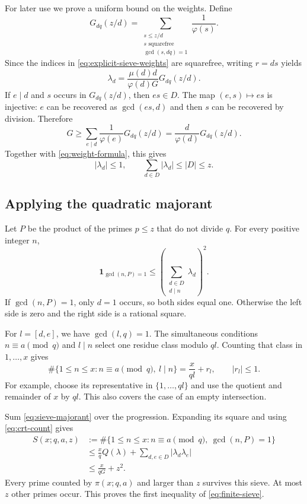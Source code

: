 For later use we prove a uniform bound on the weights.  Define
\[
 G_{dq}(z/d)=
 \sum_{\substack{s\leq z/d\\s\text{ squarefree}\\\gcd(s,dq)=1}}
 \frac1{\varphi(s)}.
\]
Since the indices in \eqref{eq:explicit-sieve-weights} are squarefree,
writing $r=ds$ yields
\begin{equation}
 \lambda_d=\frac{\mu(d)d}{\varphi(d)G}G_{dq}(z/d).
 \label{eq:weight-formula}
\end{equation}
If $e\mid d$ and $s$ occurs in $G_{dq}(z/d)$, then $es\in D$.
The map $(e,s)\mapsto es$ is injective: $e$ can be recovered as
$\gcd(es,d)$ and then $s$ can be recovered by division.  Therefore
\[
 G\geq\sum_{e\mid d}\frac1{\varphi(e)}G_{dq}(z/d)
 =\frac d{\varphi(d)}G_{dq}(z/d).
\]
Together with \eqref{eq:weight-formula}, this gives
\begin{equation}
 |\lambda_d|\leq1,
 \qquad \sum_{d\in D}|\lambda_d|\leq |D|\leq z.
 \label{eq:weight-bound}
\end{equation}

\subsection{Applying the quadratic majorant}

Let $P$ be the product of the primes $p\leq z$ that do not divide $q$.
For every positive integer $n$,
\begin{equation}
 \boldsymbol{1}_{\gcd(n,P)=1}
 \leq\left(\sum_{\substack{d\in D\\d\mid n}}\lambda_d\right)^2.
 \label{eq:sieve-majorant}
\end{equation}
If $\gcd(n,P)=1$, only $d=1$ occurs, so both sides equal one.
Otherwise the left side is zero and the right side is a rational
square.

For $l=[d,e]$, we have $\gcd(l,q)=1$.  The simultaneous conditions
$n\equiv a\pmod q$ and $l\mid n$ select one residue class modulo $ql$.
Counting that class in $1,\ldots,x$ gives
\begin{equation}
 \#\{1\leq n\leq x:n\equiv a\pmod q,\ l\mid n\}
 =\frac{x}{ql}+r_l,
 \qquad |r_l|\leq1.
 \label{eq:crt-count}
\end{equation}
For example, choose its representative in $\{1,\ldots,ql\}$ and use
the quotient and remainder of $x$ by $ql$.  This also covers the case
of an empty intersection.

Sum \eqref{eq:sieve-majorant} over the progression.  Expanding its
square and using \eqref{eq:crt-count} gives
\begin{align*}
 S(x;q,a,z)
 &:=\#\{1\leq n\leq x:n\equiv a\pmod q,\ \gcd(n,P)=1\}\\
 &\leq\frac{x}{q}Q(\lambda)
       +\sum_{d,e\in D}|\lambda_d\lambda_e|\\
 &\leq\frac{x}{qG}+z^2.
\end{align*}
Every prime counted by $\pi(x;q,a)$ and larger than $z$ survives this
sieve.  At most $z$ other primes occur.  This proves the first
inequality of \eqref{eq:finite-sieve}.

